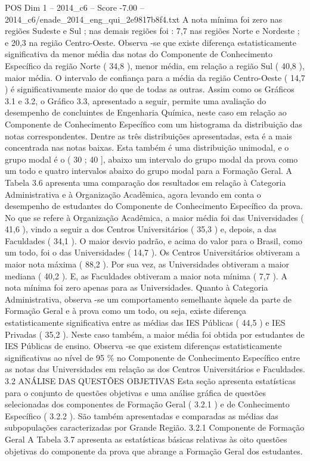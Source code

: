 \begin{textsample}{POS Dim 1 – 2014\_c6 – Score -7.00 – 2014\_c6/enade\_2014\_eng\_qui\_2e9817b8f4.txt}
A nota mínima foi zero nas regiões Sudeste e Sul ; nas demais regiões foi : 7,7 nas regiões Norte e Nordeste ; e 20,3 na região Centro-Oeste.
Observa -se que existe diferença estatisticamente significativa da menor média das notas do Componente de Conhecimento Específico da região Norte ( 34,8 ), menor média, em relação a região Sul ( 40,8 ), maior média.
O intervalo de confiança para a média da região Centro-Oeste ( 14,7 ) é significativamente maior do que de todas as outras.
Assim como os Gráficos 3.1 e 3.2, o Gráfico 3.3, apresentado a seguir, permite uma avaliação do desempenho de concluintes de Engenharia Química, neste caso em relação ao Componente de Conhecimento Específico com um histograma da distribuição das notas correspondentes.
Dentre as três distribuições apresentadas, esta é a mais concentrada nas notas baixas.
Esta também é uma distribuição unimodal, e o grupo modal é o ( 30 ; 40 ], abaixo um intervalo do grupo modal da prova como um todo e quatro intervalos abaixo do grupo modal para a Formação Geral.
A Tabela 3.6 apresenta uma comparação dos resultados em relação à Categoria Administrativa e à Organização Acadêmica, agora levando em conta o desempenho de estudantes do Componente de Conhecimento Específico da prova.
No que se refere à Organização Acadêmica, a maior média foi das Universidades ( 41,6 ), vindo a seguir a dos Centros Universitários ( 35,3 ) e, depois, a das Faculdades ( 34,1 ).
O maior desvio padrão, e acima do valor para o Brasil, como um todo, foi o das Universidades ( 14,7 ).
Os Centros Universitários obtiveram a maior nota máxima ( 88,2 ).
Por sua vez, as Universidades obtiveram a maior mediana ( 40,2 ).
E, as Faculdades obtiveram a maior nota mínima ( 7,7 ).
A nota mínima foi zero apenas para as Universidades.
Quanto à Categoria Administrativa, observa -se um comportamento semelhante àquele da parte de Formação Geral e à prova como um todo, ou seja, existe diferença estatisticamente significativa entre as médias das IES Públicas ( 44,5 ) e IES Privadas ( 35,2 ).
Neste caso também, a maior média foi obtida por estudantes de IES Públicas de ensino.
Observa -se que existem diferenças estatisticamente significativas ao nível de 95 \% no Componente de Conhecimento Específico entre as notas das Universidades em relação as dos Centros Universitários e Faculdades. 3.2 ANÁLISE DAS QUESTÕES OBJETIVAS Esta seção apresenta estatísticas para o conjunto de questões objetivas e uma análise gráfica de questões selecionadas dos componentes de Formação Geral ( 3.2.1 ) e de Conhecimento Específico ( 3.2.2 ).
São também apresentadas e comparadas as médias das subpopulações caracterizadas por Grande Região. 3.2.1 Componente de Formação Geral A Tabela 3.7 apresenta as estatísticas básicas relativas às oito questões objetivas do componente da prova que abrange a Formação Geral dos estudantes.

\end{textsample}
